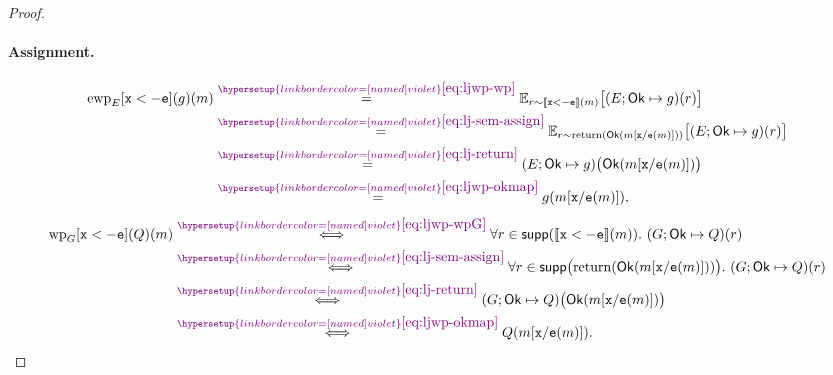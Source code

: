 \documentclass[acmsmall,natbib,review,screen,anonymous,10pt]{acmart}
\makeatletter
\let\@msm@th@eqref\eqref
\renewcommand{\eqref}[1]{%
  \begingroup
  \leavevmode
  \color{violet}%
  \hypersetup{linkbordercolor=[named]{violet}}%
  \@msm@th@eqref{#1}%
  \endgroup
}
\makeatother
\begin{document}
\begin{proof}
\paragraph{Assignment.}
\[
  \begin{aligned}
  \mathrm{ewp}_{E}[\vx <- \expression{e}](g)(m)
  &\overset{\eqref{eq:ljwp-wp}}{=}
  \mathbb E_{r\sim\llbracket \vx <- \expression{e}\rrbracket(m)}
  \bigl[(E;\mathsf{Ok}\mapsto g)(r)\bigr]\\
  &\overset{\eqref{eq:lj-sem-assign}}{=}
  \mathbb E_{r\sim\operatorname{return}(\mathsf{Ok}(m[\vx\mapped\expression{e}(m)]))}
  \bigl[(E;\mathsf{Ok}\mapsto g)(r)\bigr]\\
  &\overset{\eqref{eq:lj-return}}{=}
  (E;\mathsf{Ok}\mapsto g)\bigl(\mathsf{Ok}(m[\vx\mapped\expression{e}(m)])\bigr)\\
  &\overset{\eqref{eq:ljwp-okmap}}{=}
  g(m[\vx\mapped\expression{e}(m)]),
  \end{aligned}
\]
\[
  \begin{aligned}
  \mathrm{wp}_{G}[\vx <- \expression{e}](Q)(m)
  &\overset{\eqref{eq:ljwp-wpG}}{\iff}
  \forall r\in\supp(\llbracket \vx <- \expression{e}\rrbracket(m)).\
  (G;\mathsf{Ok}\mapsto Q)(r)\\
  &\overset{\eqref{eq:lj-sem-assign}}{\iff}
  \forall r\in\supp\bigl(\operatorname{return}(\mathsf{Ok}(m[\vx\mapped\expression{e}(m)]))\bigr).\
  (G;\mathsf{Ok}\mapsto Q)(r)\\
  &\overset{\eqref{eq:lj-return}}{\iff}
  (G;\mathsf{Ok}\mapsto Q)\bigl(\mathsf{Ok}(m[\vx\mapped\expression{e}(m)])\bigr)\\
  &\overset{\eqref{eq:ljwp-okmap}}{\iff}
  Q(m[\vx\mapped\expression{e}(m)]).
  \end{aligned}
\]


\end{proof}
\end{document}
